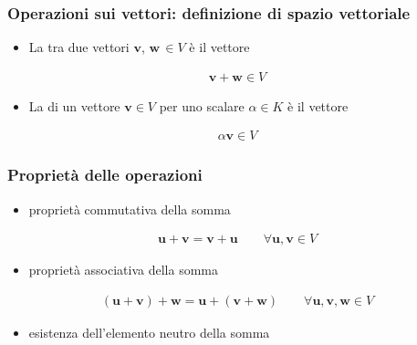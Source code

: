 \documentclass[letterpaper,10pt,italian]{jupyterBook}
\begin{document}
\subsubsection{Operazioni sui vettori: definizione di spazio vettoriale}
\label{\detokenize{ch/algebra/vector-algebra-def:operazioni-sui-vettori-definizione-di-spazio-vettoriale}}\begin{itemize}
\item {} 
\sphinxAtStartPar
La  tra due vettori \(\mathbf{v}\), \(\mathbf{w} \, \in V\) è il vettore

\end{itemize}
\begin{equation*}
\begin{split}\mathbf{v} + \mathbf{w} \in V\end{split}
\end{equation*}\begin{itemize}
\item {} 
\sphinxAtStartPar
La  di un vettore \(\mathbf{v} \in V\) per uno scalare \(\alpha \in K\) è il vettore

\end{itemize}
\begin{equation*}
\begin{split}\alpha \mathbf{v} \in V\end{split}
\end{equation*}\subsubsection*{Proprietà delle operazioni}
\begin{itemize}
\item {} 
\sphinxAtStartPar
proprietà commutativa della somma

\end{itemize}
\begin{equation*}
\begin{split}\mathbf{u} + \mathbf{v} = \mathbf{v} + \mathbf{u} \qquad \forall \mathbf{u}, \mathbf{v} \in V\end{split}
\end{equation*}\begin{itemize}
\item {} 
\sphinxAtStartPar
proprietà associativa della somma

\end{itemize}
\begin{equation*}
\begin{split}(\mathbf{u} + \mathbf{v}) + \mathbf{w} = \mathbf{u} + ( \mathbf{v} + \mathbf{w} ) \qquad \forall \mathbf{u}, \mathbf{v}, \mathbf{w} \in V\end{split}
\end{equation*}\begin{itemize}
\item {} 
\sphinxAtStartPar
esistenza dell’elemento neutro della somma

\end{itemize}
\end{document}
